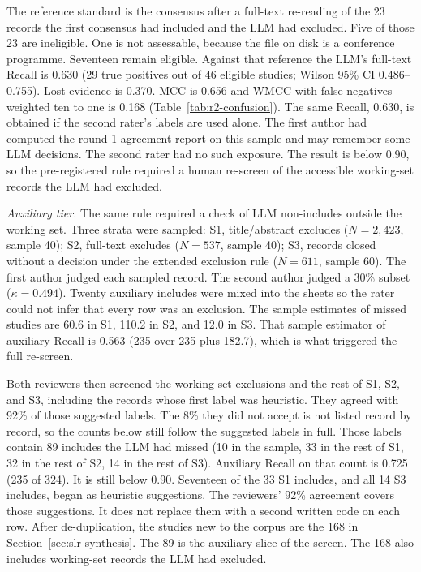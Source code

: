 The reference standard is the consensus after a full-text re-reading of the
23 records the first consensus had included and the LLM had excluded. Five of
those 23 are ineligible. One is not assessable, because the file on disk is
a conference programme. Seventeen remain eligible. Against that reference the
LLM's full-text Recall is 0.630 (29 true positives out of 46 eligible
studies; Wilson 95\% CI 0.486--0.755). Lost evidence is 0.370. MCC is 0.656
and WMCC with false negatives weighted ten to one is 0.168
(Table~\ref{tab:r2-confusion}). The same Recall, 0.630, is obtained if the
second rater's labels are used alone. The first author had computed the
round-1 agreement report on this sample and may remember some LLM decisions.
The second rater had no such exposure. The result is below 0.90, so the
pre-registered rule required a human re-screen of the accessible working-set
records the LLM had excluded.

\emph{Auxiliary tier.} The same rule required a check of LLM non-includes
outside the working set. Three strata were sampled: S1, title/abstract
excludes ($N=2{,}423$, sample 40); S2, full-text excludes ($N=537$, sample
40); S3, records closed without a decision under the extended exclusion rule
($N=611$, sample 60). The first author judged each sampled record. The second
author judged a 30\% subset ($\kappa = 0.494$). Twenty auxiliary includes
were mixed into the sheets so the rater could not infer that every row was
an exclusion. The sample estimates of missed studies are 60.6 in S1, 110.2
in S2, and 12.0 in S3. That sample estimator of auxiliary Recall is 0.563
(235 over 235 plus 182.7), which is what triggered the full re-screen.

Both reviewers then screened the working-set exclusions and the rest of
S1, S2, and S3, including the records whose first label was heuristic.
They agreed with 92\% of those suggested labels. The 8\% they did not
accept is not listed record by record, so the counts below still follow
the suggested labels in full. Those labels contain 89 includes the LLM
had missed (10 in the sample, 33 in the rest of S1, 32 in the rest of S2,
14 in the rest of S3). Auxiliary Recall on that count is 0.725 (235 of
324). It is still below 0.90. Seventeen of the 33 S1 includes, and all 14
S3 includes, began as heuristic suggestions. The reviewers' 92\% agreement
covers those suggestions. It does not replace them with a second written
code on each row. After de-duplication, the studies new to the corpus are
the 168 in Section~\ref{sec:slr-synthesis}. The 89 is the auxiliary slice
of the screen. The 168 also includes working-set records the LLM had
excluded.

